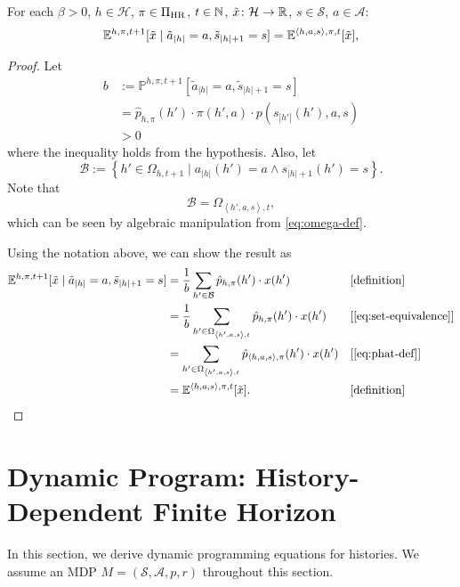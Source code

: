 \begin{theorem} \label{thm:exph-cond-eq-hist}
For each $\beta >0$, $h\in \mathcal{H}$, $\pi\in \Pi_{\mathrm{HR}}$, $t\in \mathbb{N}$, $\tilde{x}\colon \mathcal{H} \to \mathbb{R}$, $s\in \mathcal{S}$, $a\in \mathcal{A}$:
\[
  \mathbb{E}^{h,\pi,t+1}[\tilde{x} \mid \tilde{a}_{|h|} = a, \tilde{s}_{|h|+1} = s]
  =
  \mathbb{E}^{\langle h, a, s\rangle,\pi,t}[\tilde{x}],
\]
\end{theorem}
\begin{proof}
  Let
  \[
    \begin{aligned}
      b &:= \mathbb{P}^{h,\pi,t+1} \left[ \tilde{a}_{|h|} = a, \tilde{s}_{|h|+1} = s \right] \\
      &= \hat{p}_{h,\pi}(h') \cdot  \pi(h', a) \cdot p(s_{|h'|}(h'), a, s) \\
       &> 0
    \end{aligned}
  \]
  where the inequality holds from the hypothesis. Also, let
  \[
    \mathcal{B} := \left\{ h'\in \Omega_{h,t+1} \mid a_{|h|}(h') = a \wedge s_{|h|+1}(h') = s\right\}.
  \]
  Note that
  \begin{equation} \label{eq:set-equivalence}
    \mathcal{B} = \Omega_{\left< h', a, s \right>, t},
\end{equation}
  which can be seen by algebraic manipulation from \eqref{eq:omega-def}.

  Using the notation above, we can show the result as
  \begin{align*}
  \E^{h,\pi,t+1}[\tilde{x} \mid \tilde{a}_{|h|} = a, \tilde{s}_{|h|+1} = s]
  &= \frac{1}{b} \sum_{h'\in \mathcal{B}} \hat{p}_{h,\pi}(h') \cdot x(h')
  && \why{definition}\\
  &= \frac{1}{b} \sum_{h'\in \Omega_{\left< h', a, s \right>, t}} \hat{p}_{h,\pi}(h') \cdot x(h')
  && \why{\cref{eq:set-equivalence}} \\
  &= \sum_{h'\in \Omega_{\left< h', a, s \right>, t}} \hat{p}_{\left<h, a,s  \right>,\pi}(h') \cdot x(h')
  && \why{\cref{eq:phat-def}} \\
  &= \E^{\langle h, a, s\rangle,\pi,t}[\tilde{x}]. && \why{definition}
  \end{align*}
\end{proof}

\section{Dynamic Program: History-Dependent Finite Horizon}

In this section, we derive dynamic programming equations for histories. We assume an MDP $M = (\mathcal{S}, \mathcal{A}, p, r)$ throughout this section.

